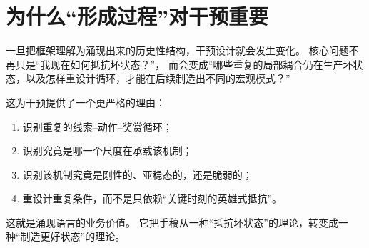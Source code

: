 \section{为什么“形成过程”对干预重要}

一旦把框架理解为涌现出来的历史性结构，干预设计就会发生变化。
核心问题不再只是“我现在如何抵抗坏状态？”，
而会变成“哪些重复的局部耦合仍在生产坏状态，以及怎样重设计循环，才能在后续制造出不同的宏观模式？”

这为干预提供了一个更严格的理由：
\begin{enumerate}[nosep]
  \item 识别重复的线索--动作--奖赏循环；
  \item 识别究竟是哪一个尺度在承载该机制；
  \item 识别该机制究竟是刚性的、亚稳态的，还是脆弱的；
  \item 重设计重复条件，而不是只依赖“关键时刻的英雄式抵抗”。
\end{enumerate}

这就是涌现语言的业务价值。
它把手稿从一种“抵抗坏状态”的理论，转变成一种“制造更好状态”的理论。